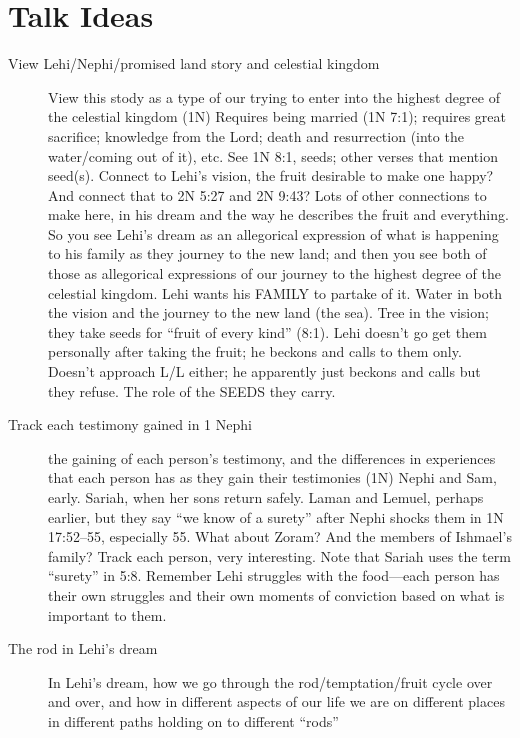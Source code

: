 \section{Talk Ideas}
	\label{TALKIDEAS}
	
	\begin{description}
	
		\item[View Lehi/Nephi/promised land story and celestial kingdom]
			View this stody as a type of our trying to enter into the highest degree of the celestial kingdom (1N)
			Requires being married (1N 7:1); requires great sacrifice; knowledge from the Lord; death and resurrection (into the water/coming out of it), etc.
			See 1N 8:1, seeds; other verses that mention seed(s).
			Connect to Lehi's vision, the fruit desirable to make one happy? And connect that to 2N 5:27 and 2N 9:43? Lots of other connections to make here, in his dream and the way he describes the fruit and everything.
				So you see Lehi's dream as an allegorical expression of what is happening to his family as they journey to the new land; and then you see both of those as allegorical expressions of our journey to the highest degree of the celestial kingdom.
				Lehi wants his FAMILY to partake of it.
				Water in both the vision and the journey to the new land (the sea).
				Tree in the vision; they take seeds for ``fruit of every kind'' (8:1).
				Lehi doesn't go get them personally after taking the fruit; he beckons and calls to them only. Doesn't approach L/L either; he apparently just beckons and calls but they refuse.
				The role of the SEEDS they carry.
				
		\item[Track each testimony gained in 1 Nephi]
			the gaining of each person's testimony, and the differences in experiences that each person has as they gain their testimonies (1N)
			Nephi and Sam, early. Sariah, when her sons return safely. Laman and Lemuel, perhaps earlier, but they say ``we know of a surety'' after Nephi shocks them in 1N 17:52--55, especially 55. What about Zoram? And the members of Ishmael's family? Track each person, very interesting.
			Note that Sariah uses the term ``surety'' in 5:8. Remember Lehi struggles with the food---each person has their own struggles and their own moments of conviction based on what is important to them.
			
		\item[The rod in Lehi's dream]
			In Lehi's dream, how we go through the rod/temptation/fruit cycle over and over, and how in different aspects of our life we are on different places in different paths holding on to different ``rods''
			

\end{description}
